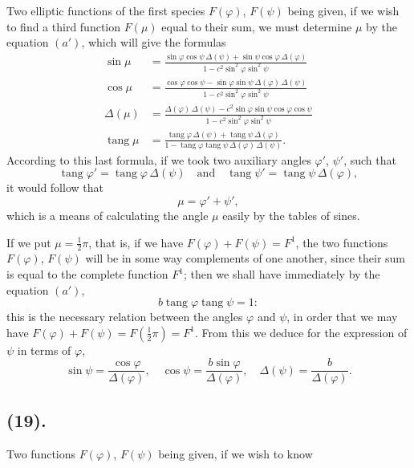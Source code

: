\documentclass{article}
\begin{document}
Two elliptic functions of the first species $F(\varphi)$, $F(\psi)$ being given, if we wish to find a third function $F(\mu)$ equal to their sum, we must determine $\mu$ by the equation $(a')$, which will give the formulas
\[ \begin{aligned} \sin\mu &= \frac{\sin\varphi\cos\psi\,\Delta(\psi)+\sin\psi\cos\varphi\,\Delta(\varphi)}{1-c^{2}\sin^{2}\varphi\sin^{2}\psi} \\ \cos\mu &= \frac{\cos\varphi\cos\psi-\sin\varphi\sin\psi\,\Delta(\varphi)\,\Delta(\psi)}{1-c^{2}\sin^{2}\varphi\sin^{2}\psi} \\ \Delta(\mu) &= \frac{\Delta(\varphi)\,\Delta(\psi)-c^{2}\sin\varphi\sin\psi\cos\varphi\cos\psi}{1-c^{2}\sin^{2}\varphi\sin^{2}\psi} \\ \operatorname{tang}\mu &= \frac{\operatorname{tang}\varphi\,\Delta(\psi)+\operatorname{tang}\psi\,\Delta(\varphi)}{1-\operatorname{tang}\varphi\operatorname{tang}\psi\,\Delta(\varphi)\,\Delta(\psi)}. \end{aligned} \]
According to this last formula, if we took two auxiliary angles $\varphi'$, $\psi'$, such that
\[ \operatorname{tang}\varphi'=\operatorname{tang}\varphi\,\Delta(\psi) \quad\text{and}\quad \operatorname{tang}\psi'=\operatorname{tang}\psi\,\Delta(\varphi), \]
it would follow that
\[ \mu=\varphi'+\psi', \]
which is a means of calculating the angle $\mu$ easily by the tables of sines.

If we put $\mu=\frac{1}{2}\pi$, that is, if we have $F(\varphi)+F(\psi)=F^{1}$, the two functions $F(\varphi)$, $F(\psi)$ will be in some way complements of one another, since their sum is equal to the complete function $F^{1}$; then we shall have immediately by the equation $(a')$,
\[ b\operatorname{tang}\varphi\operatorname{tang}\psi=1: \]
this is the necessary relation between the angles $\varphi$ and $\psi$, in order that we may have $F(\varphi)+F(\psi)=F(\frac{1}{2}\pi)=F^{1}$. From this we deduce for the expression of $\psi$ in terms of $\varphi$,
\[ \sin\psi=\frac{\cos\varphi}{\Delta(\varphi)}, \quad \cos\psi=\frac{b\sin\varphi}{\Delta(\varphi)}, \quad \Delta(\psi)=\frac{b}{\Delta(\varphi)}. \]

\subsection*{(19).}

Two functions $F(\varphi)$, $F(\psi)$ being given, if we wish to know
\end{document}
